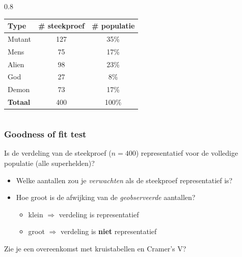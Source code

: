 \documentclass[aspectratio=169]{beamer}
\begin{document}
\begin{frame}
\begin{columns}
  \begin{column} { 0.8 \textwidth}
    \begin{table}[h]
      \begin{tabular}{@{}lcc@{}}
      	\toprule
      	\textbf{Type}   & \textbf{\# steekproef} & \textbf{\# populatie} \\ \midrule
      	Mutant          &          127           &         35\%          \\
      	Mens            &           75           &         17\%          \\
      	Alien           &           98           &         23\%          \\
      	God             &           27           &          8\%          \\
      	Demon           &           73           &         17\%          \\ \midrule
      	\textbf{Totaal} &          400           &         100\%         \\
      \end{tabular}
    \end{table}
  \end{column}
\end{columns}
\end{frame}

\begin{frame}
  \frametitle{Goodness of fit test}
   Is de verdeling van de steekproef ($n = 400$) representatief voor de volledige populatie (alle superhelden)?

  \begin{itemize}
    \item Welke aantallen zou je \textit{verwachten} als de steekproef representatief is?
    \item Hoe groot is de afwijking van de \textit{geobserveerde} aantallen?
    \begin{itemize}
      \item klein $\Rightarrow$ verdeling is representatief
      \item groot $\Rightarrow$ verdeling is \textbf{niet} representatief
    \end{itemize}
  \end{itemize}

  \pause
  Zie je een overeenkomst met kruistabellen en Cramer's V?
\end{frame}
\end{document}
